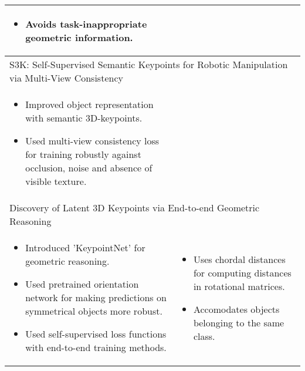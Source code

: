 \begin{longtable}{|p{7cm}|p{7cm}|}
\begin{itemize}
        \item Avoids task-inappropriate geometric information.
    \end{itemize}                                                                                            &                                                                                                                  \\ \hline
    \multicolumn{2}{m{14cm}}{\centering S3K: Self-Supervised Semantic Keypoints for Robotic Manipulation via Multi-View Consistency\cite{vecerik2020s3k}}                                                                       \\ \hline
    \begin{itemize}
        \itemsep0em
        \item Improved object representation with semantic 3D-keypoints.
        \item Used multi-view consistency loss for training robustly against occlusion, noise and absence of visible texture.
    \end{itemize}                                                    &                                                                                                        \\ \hline
    \multicolumn{2}{m{14cm}}{\centering Discovery of Latent 3D Keypoints via End-to-end Geometric Reasoning\cite{suwajanakorn2018discovery}}                                                                                    \\ \hline
    \begin{itemize}
        \itemsep0em
        \item Introduced 'KeypointNet' for geometric reasoning.
        \item Used pretrained orientation network for making predictions on symmetrical objects more robust.
        \item Used self-supervised loss functions with end-to-end training methods.
    \end{itemize}                                                                     & \begin{itemize}
                                                                                            \itemsep0em
                                                                                            \item Uses chordal distances for computing distances in rotational matrices.
                                                                                            \item Accomodates objects belonging to the same class.

\end{itemize}
\end{longtable}
